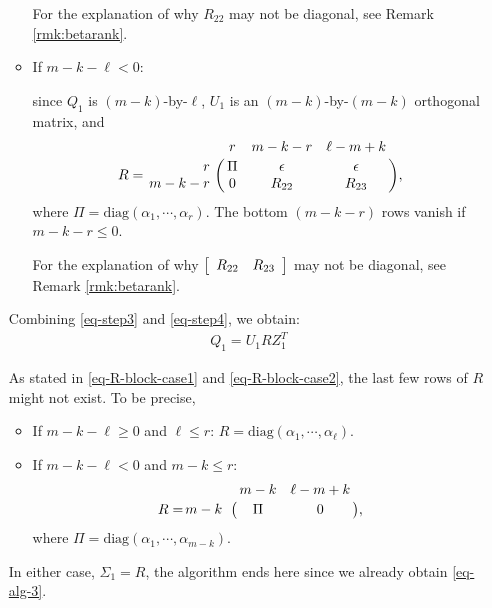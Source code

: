 \begin{enumerate}[Step 2(1).]
\begin{itemize}
For the explanation of why $R_{22}$ may not be diagonal, 
see Remark \ref{rmk:betarank}.
	
	\item If $m - k - \ell < 0$:
	
        since $Q_1$ is $(m-k)$-by-$\ell$, 
	$U_{1}$ is an $(m-k)$-by-$(m-k)$ orthogonal matrix, and
    \begin{equation} \label{eq-R-block-case2}
        R = \bordermatrix{ & r & m-k-r & \ell-m+k \cr
        \hfill r & \Pi & \epsilon & \epsilon \cr
        \hfill m-k-r & 0 & R_{22} & R_{23} }, 
    \end{equation}
where $\Pi = \mbox{diag}(\alpha_{1}, \cdots, \alpha_{r})$. 
The bottom $(m-k-r)$ rows vanish if $m-k-r \leq 0$.

For the explanation of why $\left[ \begin{array}{cc} R_{22} & R_{23} \end{array} \right]$ may not be diagonal, 
see Remark \ref{rmk:betarank}.

\end{itemize}
Combining \eqref{eq-step3} and \eqref{eq-step4}, we obtain:
\begin{align} \label{eq-q_1-case1}
Q_1 = U_{1}RZ_{1}^{T}
\end{align}



As stated in \eqref{eq-R-block-case1} and \eqref{eq-R-block-case2}, the last few rows of $R$ might not exist. To be precise,

\begin{itemize}
	\item If $m - k - \ell \geq 0$ and $\ell \leq r$:
		$R = \mbox{diag}(\alpha_{1}, \cdots, \alpha_{\ell})$.
	\item If $m - k - \ell < 0$ and $m - k \leq r$:
		\begin{equation} \label{eq-R-earlyexit-case2}
            R = \bordermatrix{ & m-k & \ell-m+k \cr
            \hfill m-k & \Pi & 0}, 
    	\end{equation}
		where $\Pi = \mbox{diag}(\alpha_{1}, \cdots, \alpha_{m-k})$.
\end{itemize}
In either case, $\Sigma_{1} = R$, the algorithm ends here since we already obtain \eqref{eq-alg-3}.


\end{enumerate}
